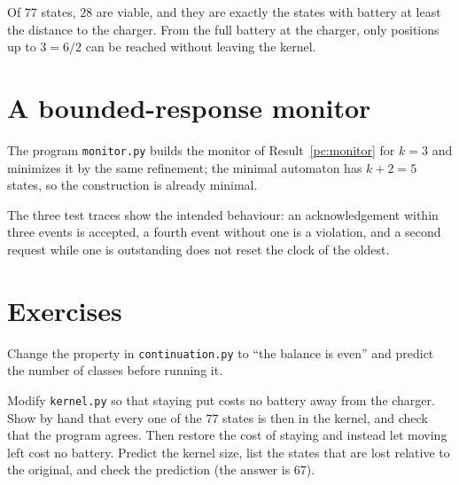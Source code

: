 



Of $77$ states, $28$ are viable, and they are exactly the states with battery at least the distance to the charger. From the full battery at the charger, only positions up to $3=6/2$ can be reached without leaving the kernel.

\section{A bounded-response monitor}

The program \texttt{monitor.py} builds the monitor of Result~\ref{pc:monitor} for $k=3$ and minimizes it by the same refinement; the minimal automaton has $k+2=5$ states, so the construction is already minimal.





The three test traces show the intended behaviour: an acknowledgement within three events is accepted, a fourth event without one is a violation, and a second request while one is outstanding does not reset the clock of the oldest.

\section*{Exercises}

\begin{exercise}
Change the property in \texttt{continuation.py} to ``the balance is even'' and predict the number of classes before running it.
\end{exercise}

\begin{exercise}
Modify \texttt{kernel.py} so that staying put costs no battery away from the charger. Show by hand that every one of the $77$ states is then in the kernel, and check that the program agrees. Then restore the cost of staying and instead let moving left cost no battery. Predict the kernel size, list the states that are lost relative to the original, and check the prediction (the answer is $67$).
\end{exercise}

